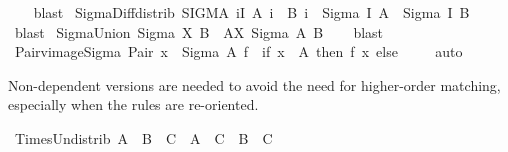 \begin{isabellebody}
%
\isadelimproof
\ \ %
\endisadelimproof
%
\isatagproof
{}\isamarkupfalse%
\ blast%
\endisatagproof
{\isafoldproof}%
%
\isadelimproof
\isanewline
%
\endisadelimproof
\isanewline
{}\isamarkupfalse%
\ Sigma{\isacharunderscore}{\kern0pt}Diff{\isacharunderscore}{\kern0pt}distrib{}{\isacharcolon}{\kern0pt}\ {\isachardoublequoteopen}{\isacharparenleft}{\kern0pt}SIGMA\ i{\isacharcolon}{\kern0pt}I{\isachardot}{\kern0pt}\ A\ i\ {\isacharminus}{\kern0pt}\ B\ i{\isacharparenright}{\kern0pt}\ {\isacharequal}{\kern0pt}\ Sigma\ I\ A\ {\isacharminus}{\kern0pt}\ Sigma\ I\ B{\isachardoublequoteclose}\isanewline
%
\isadelimproof
\ \ %
\endisadelimproof
%
\isatagproof
{}\isamarkupfalse%
\ blast%
\endisatagproof
{\isafoldproof}%
%
\isadelimproof
\isanewline
%
\endisadelimproof
\isanewline
{}\isamarkupfalse%
\ Sigma{\isacharunderscore}{\kern0pt}Union{\isacharcolon}{\kern0pt}\ {\isachardoublequoteopen}Sigma\ {\isacharparenleft}{\kern0pt}{\isasymUnion}X{\isacharparenright}{\kern0pt}\ B\ {\isacharequal}{\kern0pt}\ {\isacharparenleft}{\kern0pt}{\isasymUnion}A{\isasymin}X{\isachardot}{\kern0pt}\ Sigma\ A\ B{\isacharparenright}{\kern0pt}{\isachardoublequoteclose}\isanewline
%
\isadelimproof
\ \ %
\endisadelimproof
%
\isatagproof
{}\isamarkupfalse%
\ blast%
\endisatagproof
{\isafoldproof}%
%
\isadelimproof
\isanewline
%
\endisadelimproof
\isanewline
{}\isamarkupfalse%
\ Pair{\isacharunderscore}{\kern0pt}vimage{\isacharunderscore}{\kern0pt}Sigma{\isacharcolon}{\kern0pt}\ {\isachardoublequoteopen}Pair\ x\ {\isacharminus}{\kern0pt}{\isacharbackquote}{\kern0pt}\ Sigma\ A\ f\ {\isacharequal}{\kern0pt}\ {\isacharparenleft}{\kern0pt}if\ x\ {\isasymin}\ A\ then\ f\ x\ else\ {\isacharbraceleft}{\kern0pt}{\isacharbraceright}{\kern0pt}{\isacharparenright}{\kern0pt}{\isachardoublequoteclose}\isanewline
%
\isadelimproof
\ \ %
\endisadelimproof
%
\isatagproof
{}\isamarkupfalse%
\ auto%
\endisatagproof
{\isafoldproof}%
%
\isadelimproof
%
\endisadelimproof
%
\begin{isamarkuptext}%
Non-dependent versions are needed to avoid the need for higher-order
  matching, especially when the rules are re-oriented.%
\end{isamarkuptext}\isamarkuptrue%
\isamarkupfalse%
\ Times{\isacharunderscore}{\kern0pt}Un{\isacharunderscore}{\kern0pt}distrib{}{\isacharcolon}{\kern0pt}\ {\isachardoublequoteopen}{\isacharparenleft}{\kern0pt}A\ {\isasymunion}\ B{\isacharparenright}{\kern0pt}\ {\isasymtimes}\ C\ {\isacharequal}{\kern0pt}\ A\ {\isasymtimes}\ C\ {\isasymunion}\ B\ {\isasymtimes}\ C\ {\isachardoublequoteclose}\isanewline

\end{isabellebody}
